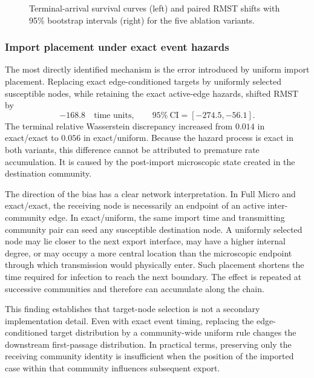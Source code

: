 \begin{figure}[t]
    \centering
    \caption{Terminal-arrival survival curves (left) and paired RMST shifts with 95\% bootstrap intervals (right) for the five ablation variants.}
    \label{fig:hazard_placement_survival_rmst}
\end{figure}

\subsubsection{Import placement under exact event hazards}
\label{sec:hazard_placement_result_placement}

The most directly identified mechanism is the error introduced by uniform import placement.  Replacing exact edge-conditioned targets by uniformly selected susceptible nodes, while retaining the exact active-edge hazards, shifted RMST by
\[
-168.8
\quad\text{time units},
\qquad
95\%\ \mathrm{CI}=[-274.5,-56.1].
\]
The terminal relative Wasserstein discrepancy increased from $0.014$ in exact/exact to $0.056$ in exact/uniform.  Because the hazard process is exact in both variants, this difference cannot be attributed to premature rate accumulation.  It is caused by the post-import microscopic state created in the destination community.

The direction of the bias has a clear network interpretation.  In Full Micro and exact/exact, the receiving node is necessarily an endpoint of an active inter-community edge.  In exact/uniform, the same import time and transmitting community pair can seed any susceptible destination node.  A uniformly selected node may lie closer to the next export interface, may have a higher internal degree, or may occupy a more central location than the microscopic endpoint through which transmission would physically enter.  Such placement shortens the time required for infection to reach the next boundary.  The effect is repeated at successive communities and therefore can accumulate along the chain.

This finding establishes that target-node selection is not a secondary implementation detail.  Even with exact event timing, replacing the edge-conditioned target distribution by a community-wide uniform rule changes the downstream first-passage distribution.  In practical terms, preserving only the receiving community identity is insufficient when the position of the imported case within that community influences subsequent export.


